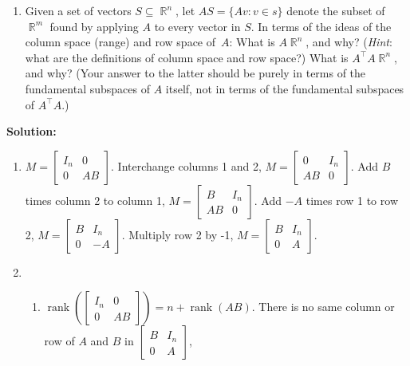 \documentclass{article}
\DeclareMathOperator{\rank}{\mathrm{rank}}
\DeclareMathOperator{\R}{\mathbb{R}}
\newenvironment{solution}{\color{blue} \smallskip \textbf{Solution:}}{}
\begin{document}
\begin{enumerate}
\begin{enumerate}
        \item
        Given a set of vectors $S \subseteq \R^n$, let $AS = \{ Av: v \in s \}$ denote the subset of $\R^m$ found by applying $A$ to every vector in $S$.
        In terms of the ideas of the column space (range) and row space of~$A$: 
        What is $A\R^n$, and why? (\emph{Hint}: what are the definitions of column space and row space?)
        What is $A^\top A\R^n$, and why? (Your answer to the latter should be purely in terms of the fundamental subspaces of $A$ itself, not in terms of the fundamental subspaces of $A^\top A$.)
    \end{enumerate}
    
    \begin{solution}
        \begin{enumerate}
        \item$
            M = \begin{bmatrix}
            I_n & 0 \\
            0 & AB
            \end{bmatrix}
        $. Interchange columns 1 and 2, $
            M = \begin{bmatrix}
            0 & I_n \\
            AB & 0
            \end{bmatrix}
        $. Add $B$ times column 2 to column 1, $
            M = \begin{bmatrix}
            B & I_n \\
            AB & 0
            \end{bmatrix}
        $. Add $-A$ times row 1 to row 2, $
            M = \begin{bmatrix}
            B & I_n \\
            0 & -A
            \end{bmatrix}
        $. Multiply row 2 by -1, $
        M = \begin{bmatrix}
            B & I_n \\
            0 & A
            \end{bmatrix}
        $.
        \item 
        \begin{enumerate}
            \item
            $\rank(\begin{bmatrix} I_n & 0 \\ 0 & AB \end{bmatrix}) = n + \rank(AB)$. 
            There is no same column or row of $A$ and $B$ in $\begin{bmatrix} B & I_n \\ 0 & A \end{bmatrix}$, 

\end{enumerate}
\end{enumerate}
\end{solution}
\end{enumerate}
\end{document}
